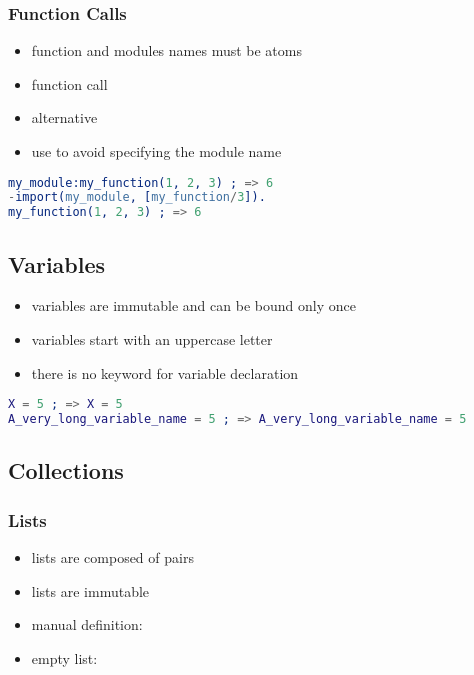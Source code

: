 \documentclass[a4paper,landscape,10pt]{article}
\begin{document}
\begin{multicols*}{2}
  \breakcolumn

  \subsubsection{Function Calls}

  \begin{itemize}
    \item function and modules names must be atoms
    \item function call 
    \item alternative 
    \item use  to avoid specifying the module name
  \end{itemize}

  \begin{lstlisting}[language=Erlang]
my_module:my_function(1, 2, 3) ; => 6
-import(my_module, [my_function/3]).
my_function(1, 2, 3) ; => 6
\end{lstlisting}

  \subsection{Variables}

  \begin{itemize}
    \item variables are immutable and can be bound only once
    \item variables start with an uppercase letter
    \item there is no keyword for variable declaration
  \end{itemize}

  \begin{lstlisting}[language=Erlang]
X = 5 ; => X = 5
A_very_long_variable_name = 5 ; => A_very_long_variable_name = 5
  \end{lstlisting}

  \subsection{Collections}

  \subsubsection{Lists}

  \begin{itemize}
    \item lists are composed of pairs
    \item lists are immutable
    \item manual definition: \ierlang{[1, 2, 3]}
    \item empty list: \ierlang{[]}
  \end{itemize}


\end{multicols*}
\end{document}
